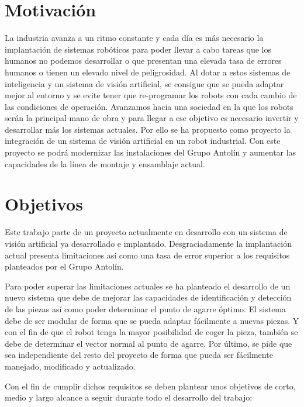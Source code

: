 \section{Motivación}
\label{chap:Introducción sec:Motivación}
La industria avanza a un ritmo constante y cada día es más necesario la implantación de sistemas robóticos para poder llevar a cabo tareas que los humanos no podemos desarrollar o que presentan una elevada tasa de errores humanos o tienen un elevado nivel de peligrosidad. Al dotar a estos sistemas de inteligencia y un sistema de visión artificial, se consigue que se pueda adaptar mejor al entorno y se evite tener que re-programar los robots con cada cambio de las condiciones de operación. Avanzamos hacia una sociedad en la que los robots serán la principal mano de obra y para llegar a ese objetivo es necesario invertir y desarrollar más los sistemas actuales. Por ello se ha propuesto como proyecto la integración de un sistema de visión artificial en un robot industrial. Con este proyecto se podrá modernizar las instalaciones del Grupo Antolín\textsuperscript{\textregistered} y aumentar las capacidades de la línea de montaje y ensamblaje actual.

\section{Objetivos}
\label{chap:Introducción sec:Objetivos}
Este trabajo parte de un proyecto actualmente en desarrollo con un sistema de visión artificial ya desarrollado e implantado. Desgraciadamente la implantación actual presenta limitaciones así como una tasa de error superior a los requisitos planteados por el Grupo Antolín.

Para poder superar las limitaciones actuales se ha planteado el desarrollo de un nuevo sistema que debe de mejorar las capacidades de identificación y detección de las piezas así como poder determinar el punto de agarre óptimo. El sistema debe de ser modular de forma que se pueda adaptar fácilmente a nuevas piezas. Y con el fin de que el robot tenga la mayor posibilidad de coger la pieza, también se debe de determinar el vector normal al punto de agarre. Por último, se pide que sea independiente del resto del proyecto de forma que pueda ser fácilmente manejado, modificado y actualizado.

Con el fin de cumplir dichos requisitos se deben plantear unos objetivos de corto, medio y largo alcance a seguir durante todo el desarrollo del trabajo:

